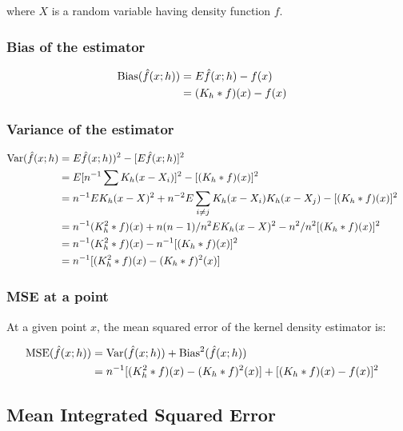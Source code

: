 where $X$ is a random variable having density function $f$.

\subsubsection{Bias of the estimator}

\begin{align}
\mbox{Bias}(\hat{f}(x;h)) & = E \hat{f}(x;h) - f(x) && \nonumber \\
    & = (K_h \ast f)(x) - f(x) &&
\end{align}

\subsubsection{Variance of the estimator}

\begin{align}
\mbox{Var}(\hat{f}(x;h) & = E\hat{f}(x;h))^2 - [E\hat{f}(x;h)]^2 && \nonumber \\
    & = E[n^{-1}\sum{K_h(x - X_i)}]^2 - [(K_h \ast f)(x)]^2 && \nonumber \\
    & = n^{-1} E K_h(x - X)^2 + n^{-2} E \sum_{i \neq j}{K_h(x-X_i)K_h(x-X_j)} - [(K_h \ast f)(x)]^2 && \nonumber \\
    & = n^{-1} (K_h^2 \ast f)(x) + n(n - 1) / n^2 E K_h(x - X)^2 - n^2 / n^2 [(K_h \ast f)(x)]^2 && \nonumber \\
    & = n^{-1} (K_h^2 \ast f)(x) - n^{-1} [(K_h \ast f)(x)]^2 && \nonumber \\
    & = n^{-1} [(K_h^2 \ast f)(x) - (K_h \ast f)^2(x)] \label{eq:VarEst}
\end{align}

\subsubsection{MSE at a point}

At a given point $x$, the mean squared error of the kernel density estimator is:

\begin{align}
\mbox{MSE}(\hat{f}(x;h)) & = \mbox{Var}(\hat{f}(x;h)) + \mbox{Bias}^2(\hat{f}(x;h)) && \nonumber \\
    & = n^{-1} [(K_h^2 \ast f)(x) - (K_h \ast f)^2(x)] + [(K_h \ast f)(x) - f(x)]^2 \label{eq:MSE}
\end{align}

\subsection{Mean Integrated Squared Error}

